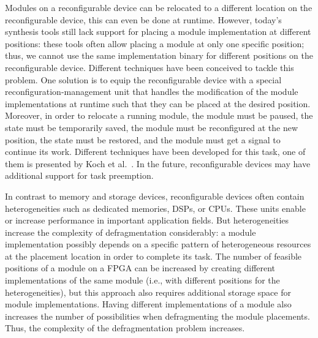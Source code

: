 \documentclass{article}
\begin{document}
Modules on a reconfigurable device can be relocated to a different location on
the reconfigurable device, this can even be done at runtime.  However, today's
synthesis tools still lack support for placing a module
implementation at different positions: these tools often allow placing a
module at only one specific position; thus, we cannot use the same
implementation binary for different positions on the reconfigurable device.
Different techniques have been conceived to tackle this problem. One solution
is to equip the reconfigurable device with a special reconfiguration-management
unit that handles the modification of the module implementations at runtime
such that they can be placed at the desired position. Moreover, in order to
relocate a running module, the module must be paused, the state must be
temporarily saved, the module must be reconfigured at the new position, the
state must be restored, and the module must get a signal to continue its work.
Different techniques have been developed for this task, one of them is
presented by Koch et al.~\cite{KHT07}. In the future, reconfigurable devices
may have additional support for task preemption.

In contrast to memory and storage devices, reconfigurable devices often contain
heterogeneities such as dedicated memories, DSPs, or CPUs. These units enable
or increase performance in important application fields. But heterogeneities
increase the complexity of defragmentation considerably: a module
implementation possibly depends on a specific pattern of heterogeneous
resources at the placement location in order to complete its task. The number
of feasible positions of a module on a FPGA can be increased by creating
different implementations of the same module (i.e., with different positions
for the heterogeneities), but this approach also requires additional storage
space for module implementations. Having different implementations of a module
also increases the number of possibilities when defragmenting the module
placements. Thus, the complexity of the defragmentation problem increases. 
\end{document}
